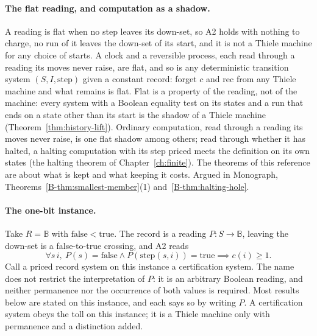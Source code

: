 \documentclass[11pt, a4paper]{report}
\theoremstyle{definition}
\theoremstyle{plain}
\newcommand{\B}{\mathbb{B}}
\newcommand{\cost}{c}
\newcommand{\cert}{P}
\begin{document}
\paragraph{The flat reading, and computation as a shadow.}
A reading is flat when no step leaves its down-set, so A2 holds with nothing
to charge, no run of it leaves the down-set of
its start, and it is not a Thiele
machine for any choice of starts. A clock and a
reversible process, each read through a reading its moves never raise, are
flat, and so is any deterministic transition system $(S, I, \mathrm{step})$
given a constant record: forget $\cost$ and
$\mathrm{rec}$ from any Thiele machine and what remains is flat. Flat is a
property of the reading, not of the machine: every system with a Boolean
equality test on its states and a run that ends on a state other than its
start is the shadow of a Thiele machine (Theorem~\ref{thm:history-lift}).
Ordinary computation, read through a reading its moves never raise, is one
flat shadow among others; read through whether it has halted, a halting
computation with its step priced meets the definition on its own states
(the halting theorem of Chapter~\ref{ch:finite}). The theorems of this
reference are about what is kept and what keeping it costs. Argued in Monograph,
Theorems~\ref{B-thm:smallest-member}(1) and~\ref{B-thm:halting-hole}.

\paragraph{The one-bit instance.}
Take $R = \B$ with $\mathrm{false} < \mathrm{true}$. The
record is a reading $\cert : S \to \B$, leaving the down-set is a
false-to-true crossing, and A2 reads
\[
\forall s\, i,\ \cert(s) = \mathrm{false} \wedge \cert(\mathrm{step}(s,i)) = \mathrm{true} \implies \cost(i) \ge 1.
\]
Call a priced record system on this instance a certification system. The name
does not restrict the interpretation of $\cert$: it is an arbitrary Boolean reading, and neither
permanence nor the occurrence of both values is required. Most results below
are stated on this instance, and each says so by writing $\cert$. A
certification system obeys the toll on this instance; it is a Thiele machine
only with permanence and a distinction added.
\end{document}

